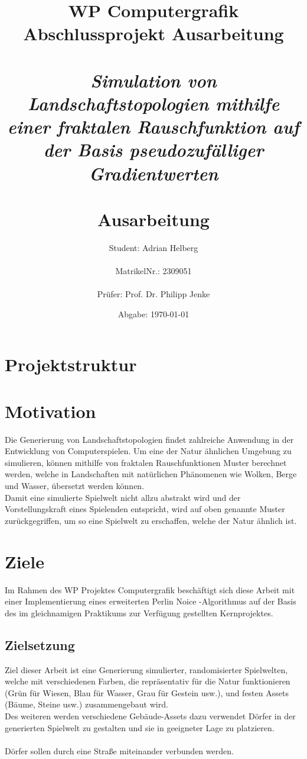 \documentclass[a4paper]{article}
\title{WP Computergrafik\\
    \small{Abschlussprojekt Ausarbeitung} \\
    \Large{\textit{\\Simulation von Landschaftstopologien mithilfe einer fraktalen Rauschfunktion auf der Basis pseudozufälliger Gradientwerten}} \\
    \Large{\textbf{\\Ausarbeitung}}}
\author{Student: Adrian Helberg \\ \\ MatrikelNr.: 2309051 \\ \\  Prüfer: Prof. Dr. Philipp Jenke}
\date{Abgabe: \today}
\begin{document}
	\maketitle
	\newpage 
	\tableofcontents 
	\newpage 


	\section{Projektstruktur}

    

	\section{Motivation}	

	Die Generierung von Landschaftstopologien findet zahlreiche Anwendung in der Entwicklung von Computerspielen. Um eine der Natur ähnlichen Umgebung zu simulieren, können mithilfe 		von fraktalen Rauschfunktionen Muster berechnet werden, welche in Landschaften mit natürlichen Phänomenen wie Wolken, Berge und Wasser, übersetzt werden können.\\
	Damit eine simulierte Spielwelt nicht allzu abstrakt wird und der Vorstellungskraft eines Spielenden entspricht, wird auf oben genannte Muster zurückgegriffen, um so eine Spielwelt 			zu erschaffen, welche der Natur ähnlich ist.\\
	

	\section{Ziele}

	Im Rahmen des WP Projektes \glqq Computergrafik\grqq{}  besch\"aftigt sich diese Arbeit mit einer Implementierung eines erweiterten \glqq Perlin Noice\grqq{} -Algorithmus auf der 		Basis des im gleichnamigen Praktikums zur Verfügung gestellten Kernprojektes.

	\subsection{Zielsetzung}

	Ziel dieser Arbeit ist eine Generierung simulierter, randomisierter Spielwelten, welche mit verschiedenen Farben, die repräsentativ für die Natur funktionieren (Gr\"un für Wiesen, 			Blau f\"ur Wasser, Grau f\"ur Gestein usw.), und festen Assets (B\"aume, Steine usw.) \glqq zusammengebaut\grqq{}  wird.\\
	Des weiteren werden verschiedene Geb\"aude-Assets dazu verwendet D\"orfer in der generierten Spielwelt zu gestalten und sie in geeigneter Lage zu platzieren.\\ \\
	D\"orfer sollen durch eine Straße miteinander verbunden werden.
\end{document}
